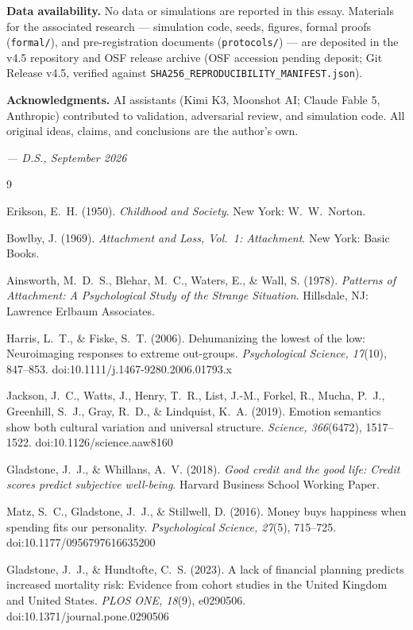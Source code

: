 \documentclass[11pt]{article}
\begin{document}
\noindent\textbf{Data availability.} No data or simulations are reported in this essay. Materials for the associated research --- simulation code, seeds, figures, formal proofs (\texttt{formal/}), and pre-registration documents (\texttt{protocols/}) --- are deposited in the v4.5 repository and OSF release archive (OSF accession pending deposit; Git Release v4.5, verified against \texttt{SHA256\_REPRODUCIBILITY\_MANIFEST.json}).

\noindent\textbf{Acknowledgments.} AI assistants (Kimi K3, Moonshot AI; Claude Fable 5, Anthropic) contributed to validation, adversarial review, and simulation code. All original ideas, claims, and conclusions are the author's own.

\vspace{1.4em}
\begin{flushright}
\emph{--- D.S., September 2026}
\end{flushright}

\begin{thebibliography}{9}
\setlength{\itemsep}{0.3em}

Erikson, E.~H. (1950).
\emph{Childhood and Society}.
New York: W.~W.~Norton.

Bowlby, J. (1969).
\emph{Attachment and Loss, Vol.~1: Attachment}.
New York: Basic Books.

Ainsworth, M.~D.~S., Blehar, M.~C., Waters, E., \& Wall, S. (1978).
\emph{Patterns of Attachment: A Psychological Study of the Strange Situation}.
Hillsdale, NJ: Lawrence Erlbaum Associates.

Harris, L.~T., \& Fiske, S.~T. (2006).
Dehumanizing the lowest of the low: Neuroimaging responses to extreme out-groups.
\emph{Psychological Science, 17}(10), 847--853.
doi:10.1111/j.1467-9280.2006.01793.x

Jackson, J.~C., Watts, J., Henry, T.~R., List, J.-M., Forkel, R., Mucha, P.~J., Greenhill, S.~J., Gray, R.~D., \& Lindquist, K.~A. (2019).
Emotion semantics show both cultural variation and universal structure.
\emph{Science, 366}(6472), 1517--1522.
doi:10.1126/science.aaw8160

Gladstone, J.~J., \& Whillans, A.~V. (2018).
\emph{Good credit and the good life: Credit scores predict subjective well-being}.
Harvard Business School Working Paper.

Matz, S.~C., Gladstone, J.~J., \& Stillwell, D. (2016).
Money buys happiness when spending fits our personality.
\emph{Psychological Science, 27}(5), 715--725.
doi:10.1177/0956797616635200

Gladstone, J.~J., \& Hundtofte, C.~S. (2023).
A lack of financial planning predicts increased mortality risk: Evidence from cohort studies in the United Kingdom and United States.
\emph{PLOS ONE, 18}(9), e0290506.
doi:10.1371/journal.pone.0290506

\end{thebibliography}
\end{document}
